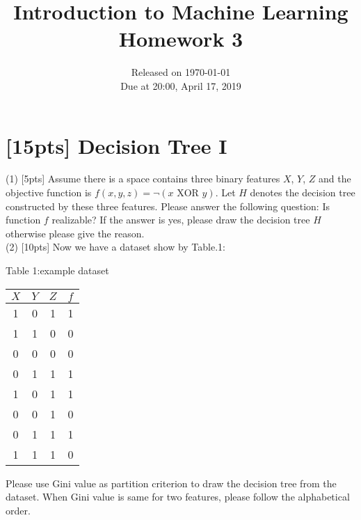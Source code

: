 \documentclass{article}
\title{Introduction to Machine Learning\\Homework 3}
\date{Released on \today \\ Due at 20:00, April 17, 2019}
\begin{document}
	\maketitle
	\section{[15pts] Decision Tree I}
    (1) [5pts] Assume there is a space contains three binary features $X$, $Y$, $Z$ and the objective function is $f(x,y,z)=\neg(x \text{ XOR } y)$. Let $H$ denotes the decision tree constructed by these three features. Please answer the following question: Is function $f$ realizable? If the answer is yes, please draw the decision tree $H$ otherwise please give the reason.\\
    (2) [10pts] Now we have a dataset show by Table.1:\\
    \begin{center}
    Table 1:example dataset\\
    \begin{tabular}{ccc|c}
    \hline
    $X$ & $Y$ & $Z$ & $f$\\
    \hline
    1 & 0 & 1 & 1\\
    1 & 1 & 0 & 0\\
    0 & 0 & 0 & 0\\
    0 & 1 & 1 & 1\\
    1 & 0 & 1 & 1\\
    0 & 0 & 1 & 0\\
    0 & 1 & 1 & 1\\
    1 & 1 & 1 & 0\\
    \hline
    \end{tabular}
    \end{center}
    Please use Gini value as partition criterion to draw the decision tree from the dataset. When Gini value is same for two features, please follow the alphabetical order.\\



\vspace{3cm}



\end{document}
